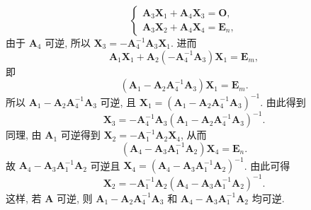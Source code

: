 \documentclass[../../main.tex]{subfiles}
\begin{document}
\begin{solution}
\[\begin{cases}
\boldsymbol{A}_3\boldsymbol{X}_1 + \boldsymbol{A}_4\boldsymbol{X}_3 = \boldsymbol{O}, \\
\boldsymbol{A}_3\boldsymbol{X}_2 + \boldsymbol{A}_4\boldsymbol{X}_4 = \boldsymbol{E}_n,
\end{cases}
\]
由于 \(\boldsymbol{A}_4\) 可逆, 所以 \(\boldsymbol{X}_3 = -\boldsymbol{A}_4^{-1}\boldsymbol{A}_3\boldsymbol{X}_1\). 进而
\[
\boldsymbol{A}_1\boldsymbol{X}_1 + \boldsymbol{A}_2(-\boldsymbol{A}_4^{-1}\boldsymbol{A}_3)\boldsymbol{X}_1 = \boldsymbol{E}_m,
\]
即
\[
(\boldsymbol{A}_1 - \boldsymbol{A}_2\boldsymbol{A}_4^{-1}\boldsymbol{A}_3)\boldsymbol{X}_1 = \boldsymbol{E}_m.
\]
所以 \(\boldsymbol{A}_1 - \boldsymbol{A}_2\boldsymbol{A}_4^{-1}\boldsymbol{A}_3\) 可逆, 且 \(\boldsymbol{X}_1 = (\boldsymbol{A}_1 - \boldsymbol{A}_2\boldsymbol{A}_4^{-1}\boldsymbol{A}_3)^{-1}\). 由此得到
\[
\boldsymbol{X}_3 = -\boldsymbol{A}_4^{-1}\boldsymbol{A}_3(\boldsymbol{A}_1 - \boldsymbol{A}_2\boldsymbol{A}_4^{-1}\boldsymbol{A}_3)^{-1}.
\]
同理, 由 \(\boldsymbol{A}_1\) 可逆得到 \(\boldsymbol{X}_2 = -\boldsymbol{A}_1^{-1}\boldsymbol{A}_2\boldsymbol{X}_4\), 从而
\[
(\boldsymbol{A}_4 - \boldsymbol{A}_3\boldsymbol{A}_1^{-1}\boldsymbol{A}_2)\boldsymbol{X}_4 = \boldsymbol{E}_n.
\]
故 \(\boldsymbol{A}_4 - \boldsymbol{A}_3\boldsymbol{A}_1^{-1}\boldsymbol{A}_2\) 可逆且 \(\boldsymbol{X}_4 = (\boldsymbol{A}_4 - \boldsymbol{A}_3\boldsymbol{A}_1^{-1}\boldsymbol{A}_2)^{-1}\). 由此可得
\[
\boldsymbol{X}_2 = -\boldsymbol{A}_1^{-1}\boldsymbol{A}_2(\boldsymbol{A}_4 - \boldsymbol{A}_3\boldsymbol{A}_1^{-1}\boldsymbol{A}_2)^{-1}.
\]
这样, 若 \(\boldsymbol{A}\) 可逆, 则 \(\boldsymbol{A}_1 - \boldsymbol{A}_2\boldsymbol{A}_4^{-1}\boldsymbol{A}_3\) 和 \(\boldsymbol{A}_4 - \boldsymbol{A}_3\boldsymbol{A}_1^{-1}\boldsymbol{A}_2\) 均可逆.


\end{solution}
\end{document}
